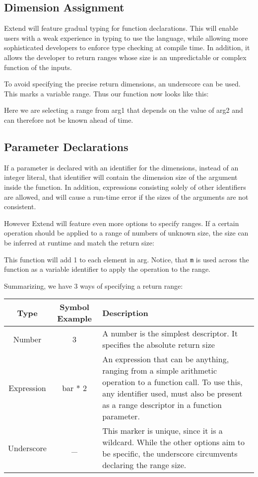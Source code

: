 \subsection{Dimension Assignment}
\par Extend will feature gradual typing for function declarations. This will enable users with a weak experience in typing to use the language, while allowing more sophisticated developers to enforce type checking at compile time. In addition, it allows the developer to return ranges whose size is an unpredictable or complex function of the inputs. 
\par To avoid specifying the precise return dimensions, an underscore can be used. This marks a variable range. Thus our function now looks like this:

Here we are selecting a range from arg1 that depends on the value of arg2 and can therefore not be known ahead of time.
\subsection{Parameter Declarations}
If a parameter is declared with an identifier for the dimensions, instead of an integer literal, that identifier will contain the dimension size of the argument inside the function. In addition, expressions consisting solely of other identifiers are allowed, and will cause a run-time error if the sizes of the arguments are not consistent. 
\par However Extend will feature even more options to specify ranges. If a certain operation should be applied to a range of numbers of unknown size, the size can be inferred at runtime and match the return size:

This function will add 1 to each element in arg. Notice, that \texttt{m} is used across the function as a variable identifier to apply the operation to the range.
\par Summarizing, we have 3 ways of specifying a return range:\newline
\begin{tabularx}{\columnwidth}{| c | c | X |} \hline
Type & Symbol Example & Description \\ \hline
Number & 3 & A number is the simplest descriptor. It specifies the absolute return size \\ \hline
Expression & bar * 2 & An expression that can be anything, ranging from a simple arithmetic operation to a function call. To use this, any identifier used, must also be present as a range descriptor in a function parameter. \\ \hline
Underscore & \_ & This marker is unique, since it is a wildcard. While the other options aim to be specific, the underscore circumvents declaring the range size. \\ \hline
\end{tabularx}
